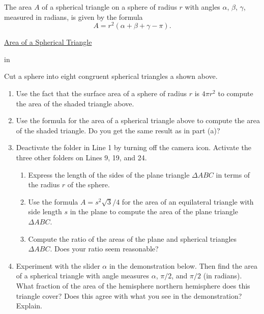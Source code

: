 \documentclass{ximera}
\newcommand{\pskip}{\vskip 0.1 in}
\begin{document}
\begin{question} \label{Q999:Radians}
The area $A$ of a spherical triangle on a sphere of radius $r$ with angles $\alpha$, $\beta$, $\gamma$, measured in radians, is given by the formula
\[
 A = r^2 (\alpha+\beta+\gamma - \pi) .
\]

\begin{onlineOnly}
    \begin{center}
\end{center}
\end{onlineOnly}



\href{https://www.desmos.com/3d/qh9mexvcv0}{Area of a Spherical Triangle}

\pskip

Cut a sphere into eight congruent spherical triangles a shown above.

\begin{enumerate}

\item Use the fact that the surface area of a sphere of radius $r$ is $4\pi r^2$ to compute the area of the shaded triangle above.

\item Use the formula for the area of a spherical triangle above to compute the area of the shaded triangle. Do you get the same result as in part (a)?

\item Deactivate the folder in Line 1 by turning off  the camera icon. Activate the three other folders on Lines 9, 19, and 24.

\begin{enumerate}

\item Express the length of the sides of the plane triangle $\Delta ABC$ in terms of the radius $r$ of the sphere.

\item Use the formula $A=s^2\sqrt{3}/4$ for the area of an equilateral triangle with side length $s$ in the plane to compute the area of the plane triangle $\Delta ABC$.

\item Compute the ratio of the areas of the plane and spherical triangles $\Delta ABC$. Does your ratio seem reasonable?
\end{enumerate}


\item Experiment with the slider $\alpha$ in the demonstration below. Then find the area of a spherical triangle with angle measures $\alpha$, $\pi/2$, and $\pi/2$ (in radians). What fraction of the area of the hemisphere northern hemisphere does this triangle cover? Does this agree with what you see in the demonstration? Explain.


\end{enumerate}
\end{question}
\end{document}
